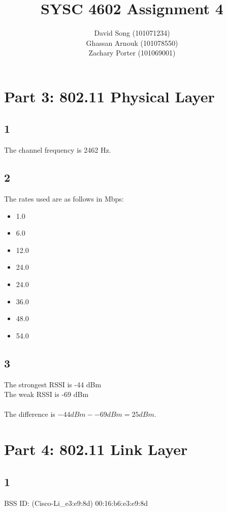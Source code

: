\documentclass{article}
\begin{document}
    \title  { \textbf{SYSC 4602 Assignment 4} }
    \author {
        David Song (101071234)\\
        Ghassan Arnouk (101078550)\\
        Zachary Porter (101069001)
    }

    \maketitle

    \clearpage
    \section*{Part 3: 802.11 Physical Layer}
    \subsection*{1}
    The channel frequency is 2462 Hz.
    \subsection*{2}
    The rates used are as follows in Mbps:
    \begin{itemize}
        \item 1.0
        \item 6.0
        \item 12.0
        \item 24.0
        \item 24.0
        \item 36.0
        \item 48.0
        \item 54.0
    \end{itemize}
    \subsection*{3}
    The strongest RSSI is -44 dBm \\
    The weak RSSI is -69 dBm \\
    \\
    The difference is $-44 dBm - -69 dBm = 25 dBm$. \\

    \section*{Part 4: 802.11 Link Layer}
    \subsection*{1}
    BSS ID: (Cisco-Li\_e3:e9:8d) 00:16:b6:e3:e9:8d
\end{document}
